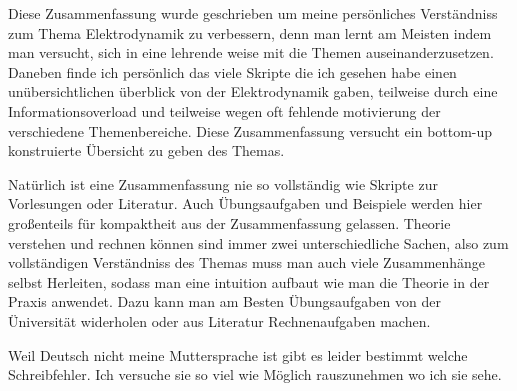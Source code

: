 Diese Zusammenfassung wurde geschrieben um meine persönliches Verständniss 
zum Thema Elektrodynamik zu verbessern, denn man lernt am Meisten indem man
versucht, sich in eine lehrende weise mit die Themen auseinanderzusetzen.
Daneben finde ich persönlich das viele Skripte die ich gesehen habe einen 
unübersichtlichen überblick von der Elektrodynamik gaben, teilweise durch
eine Informationsoverload und teilweise wegen oft fehlende motivierung der
verschiedene Themenbereiche. Diese Zusammenfassung versucht ein bottom-up
konstruierte Übersicht zu geben des Themas. 

Natürlich ist eine Zusammenfassung nie so vollständig wie Skripte zur Vorlesungen oder Literatur. Auch Übungsaufgaben und Beispiele werden hier großenteils für kompaktheit aus der Zusammenfassung gelassen. Theorie verstehen und 
rechnen können sind immer zwei unterschiedliche Sachen, also zum 
vollständigen Verständniss des Themas muss man auch viele Zusammenhänge
selbst Herleiten, sodass man eine intuition aufbaut wie man die Theorie in
der Praxis anwendet. Dazu kann man am Besten Übungsaufgaben von der Üniversität widerholen oder aus Literatur Rechnenaufgaben machen.

Weil Deutsch nicht meine Muttersprache ist gibt es leider bestimmt welche Schreibfehler. Ich versuche sie so viel wie Möglich rauszunehmen wo ich sie sehe.
